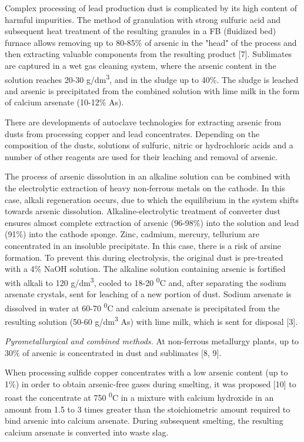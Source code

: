 \begin{multicols}{2}
Complex processing of lead production dust is complicated by its high
content of harmful impurities. The method of granulation with strong
sulfuric acid and subsequent heat treatment of the resulting granules in
a FB (fluidized bed) furnace allows removing up to 80-85\% of arsenic in
the "head" of the process and then extracting valuable components from
the resulting product {[}7{]}. Sublimates are captured in a wet gas
cleaning system, where the arsenic content in the solution reaches 20-30
g/dm\textsuperscript{3}, and in the sludge up to 40\%. The sludge is
leached and arsenic is precipitated from the combined solution with lime
milk in the form of calcium arsenate (10-12\% As).

There are developments of autoclave technologies for extracting arsenic
from dusts from processing copper and lead concentrates. Depending on
the composition of the dusts, solutions of sulfuric, nitric or
hydrochloric acids and a number of other reagents are used for their
leaching and removal of arsenic.

The process of arsenic dissolution in an alkaline solution can be
combined with the electrolytic extraction of heavy non-ferrous metals on
the cathode. In this case, alkali regeneration occurs, due to which the
equilibrium in the system shifts towards arsenic dissolution.
Alkaline-electrolytic treatment of converter dust ensures almost
complete extraction of arsenic (96-98\%) into the solution and lead
(91\%) into the cathode sponge. Zinc, cadmium, mercury, tellurium are
concentrated in an insoluble precipitate. In this case, there is a risk
of arsine formation. To prevent this during electrolysis, the original
dust is pre-treated with a 4\% NaOH solution. The alkaline solution
containing arsenic is fortified with alkali to 120
g/dm\textsuperscript{3}, cooled to 18-20 \textsuperscript{0}C and, after
separating the sodium arsenate crystals, sent for leaching of a new
portion of dust. Sodium arsenate is dissolved in water at 60-70
\textsuperscript{0}C and calcium arsenate is precipitated from the
resulting solution (50-60 g/dm\textsuperscript{3} As) with lime milk,
which is sent for disposal {[}3{]}.

\emph{Pyrometallurgical and combined methods.} At non-ferrous metallurgy
plants, up to 30\% of arsenic is concentrated in dust and sublimates
{[}8, 9{]}.

When processing sulfide copper concentrates with a low arsenic content
(up to 1\%) in order to obtain arsenic-free gases during smelting, it
was proposed {[}10{]} to roast the concentrate at 750
\textsuperscript{0}C in a mixture with calcium hydroxide in an amount
from 1.5 to 3 times greater than the stoichiometric amount required to
bind arsenic into calcium arsenate. During subsequent smelting, the
resulting calcium arsenate is converted into waste slag.


\end{multicols}
